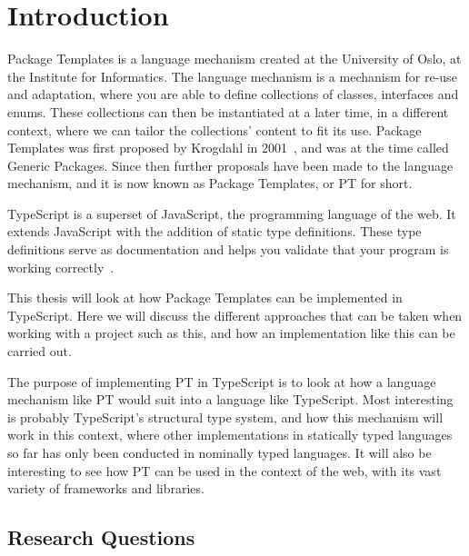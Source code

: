 
\chapter{Introduction}\label{ch:introduction}


Package Templates is a language mechanism created at the University of Oslo, at the Institute for Informatics.
The language mechanism is a mechanism for re-use and adaptation, where you are able to define collections of classes, interfaces and enums.
These collections can then be instantiated at a later time, in a different context, where we can tailor the collections' content to fit its use.
Package Templates was first proposed by Krogdahl in 2001~\cite{krogdahl:GP}, and was at the time called Generic Packages.
Since then further proposals have been made to the language mechanism, and it is now known as Package Templates, or PT for short.

TypeScript is a superset of JavaScript, the programming language of the web.
It extends JavaScript with the addition of static type definitions.
These type definitions serve as documentation and helps you validate that your program is working correctly~\cite{tswebsite}.

This thesis will look at how Package Templates can be implemented in TypeScript.
Here we will discuss the different approaches that can be taken when working with a project such as this, and how an implementation like this can be carried out.

The purpose of implementing PT in TypeScript is to look at how a language mechanism like PT would suit into a language like TypeScript.
Most interesting is probably TypeScript's structural type system, and how this mechanism will work in this context, where other implementations in statically typed languages so far has only been conducted in nominally typed languages.
It will also be interesting to see how PT can be used in the context of the web, with its vast variety of frameworks and libraries.

\section{Research Questions}\label{sec:research-questions}

